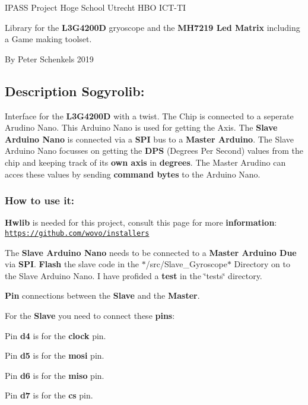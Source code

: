 I\+P\+A\+SS Project Hoge School Utrecht H\+BO I\+C\+T-\/\+TI

Library for the {\bfseries L3\+G4200D} gryoscope and the {\bfseries M\+H7219 Led Matrix} including a Game making toolset.

By Peter Schenkels 2019



 \subsection*{Description Sogyrolib\+:}

Interface for the {\bfseries L3\+G4200D} with a twist. The Chip is connected to a seperate Arudino Nano. This Arduino Nano is used for getting the Axis. The {\bfseries Slave Arduino Nano} is connected via a {\bfseries S\+PI} bus to a {\bfseries Master Arduino}. The Slave Arduino Nano focusses on getting the {\bfseries D\+PS} (Degrees Per Second) values from the chip and keeping track of it\textquotesingle{}s {\bfseries own axis} in {\bfseries degrees}. The Master Arudino can acces these values by sending {\bfseries command bytes} to the Arduino Nano.

\subsubsection*{How to use it\+:}

{\bfseries Hwlib} is needed for this project, consult this page for more {\bfseries information}\+: \href{https://github.com/wovo/installers}{\tt https\+://github.\+com/wovo/installers}

The {\bfseries Slave Arduino Nano} needs to be connected to a {\bfseries Master Arduino Due} via {\bfseries S\+PI}. {\bfseries Flash} the slave code in the $\ast$/src/\+Slave\+\_\+\+Gyroscope$\ast$ Directory on to the Slave Arduino Nano. I have profided a {\bfseries test} in the \char`\"{}tests\char`\"{} directory.

{\bfseries Pin} connections between the {\bfseries Slave} and the {\bfseries Master}.

For the {\bfseries Slave} you need to connect these {\bfseries pins}\+:


\begin{DoxyItemize}
\item Pin {\bfseries d4} is for the {\bfseries clock} pin.
\item Pin {\bfseries d5} is for the {\bfseries mosi} pin.
\item Pin {\bfseries d6} is for the {\bfseries miso} pin.
\item Pin {\bfseries d7} is for the {\bfseries cs} pin.
\end{DoxyItemize}

